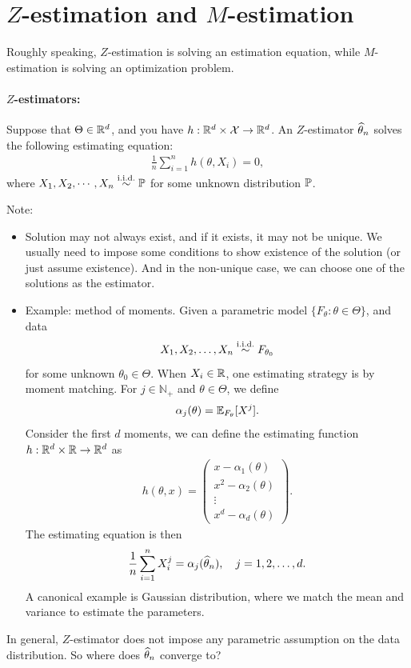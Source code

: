 \documentclass[11pt,letterpaper]{article}
\numberwithin{assumption}{lecture}
\numberwithin{theorem}{lecture}
\numberwithin{proposition}{lecture}
\numberwithin{lemma}{lecture}
\numberwithin{claim}{lecture}
\numberwithin{corollary}{lecture}
\numberwithin{definition}{lecture}
\numberwithin{conjecture}{lecture}
\numberwithin{remark}{lecture}
\numberwithin{example}{lecture}
\numberwithin{equation}{lecture}
\begin{document}
\section{$Z$-estimation and $M$-estimation}
Roughly speaking, $Z$-estimation is solving an estimation equation, while $M$-estimation is solving an optimization problem.

\paragraph{$Z$-estimators:} Suppose that $\Theta \in \mathbb{R}^d$, and you have $h: \mathbb{R}^d \times \mathcal{X} \to \mathbb{R}^d$. An $Z$-estimator $\widehat{\theta}_n$ solves the following estimating equation:
\begin{align*}
  \frac{1}{n} \sum_{i=1}^n h(\theta, X_i) = 0,
\end{align*}
where $X_1, X_2, \cdots, X_n \overset{\mathrm{i.i.d.}}{\sim} {\mathbb{P}}$ for some unknown distribution ${\mathbb{P}}$.

Note:
\begin{itemize}
  \item Solution may not always exist, and if it exists, it may not be unique. We usually need to impose some conditions to show existence of the solution (or just assume existence). And in the non-unique case, we can choose one of the solutions as the estimator.
  \item Example: method of moments. Given a parametric model $\{F_\theta: \theta \in \Theta\}$, and data
  \[
    X_1, X_2, \ldots, X_n \overset{\mathrm{i.i.d.}}{\sim} F_{\theta_0}
  \]
  for some unknown $\theta_0 \in \Theta$. When $X_i \in \mathbb{R}$, one estimating strategy is by moment matching. For $j \in \mathbb{N}_+$ and $\theta \in \Theta$, we define
  \begin{align*}
    \alpha_j (\theta) = {\mathbb{E}}_{F_\theta} [X^j].
  \end{align*}
  Consider the first $d$ moments, we can define the estimating function $h: \mathbb{R}^d \times \mathbb{R} \to \mathbb{R}^d$ as
  \begin{align*}
    h(\theta, x) = \begin{pmatrix}
      x - \alpha_1 (\theta)\\
      x^2 - \alpha_2 (\theta)\\
      \vdots\\
      x^d - \alpha_d (\theta)
    \end{pmatrix}.
  \end{align*}
  The estimating equation is then
  \begin{align*}
    \frac{1}{n} \sum_{i = 1}^n X_i^j = \alpha_j (\widehat{\theta}_n), \quad j = 1, 2, \ldots, d.
  \end{align*}
  A canonical example is Gaussian distribution, where we match the mean and variance to estimate the parameters.
\end{itemize}
In general, $Z$-estimator does not impose any parametric assumption on the data distribution. So where does $\widehat{\theta}_n$ converge to?
\end{document}
